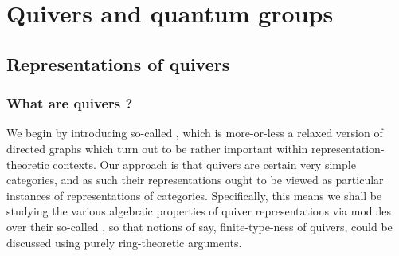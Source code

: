 \section{Quivers and quantum groups}
    \subsection{Representations of quivers}
        \subsubsection{What are quivers ?}
            We begin by introducing so-called , which is more-or-less a relaxed version of directed graphs which turn out to be rather important within representation-theoretic contexts. Our approach is that quivers are certain very simple categories, and as such their representations ought to be viewed as particular instances of representations of categories. Specifically, this means we shall be studying the various algebraic properties of quiver representations via modules over their so-called , so that notions of say, finite-type-ness of quivers, could be discussed using purely ring-theoretic arguments.
        
